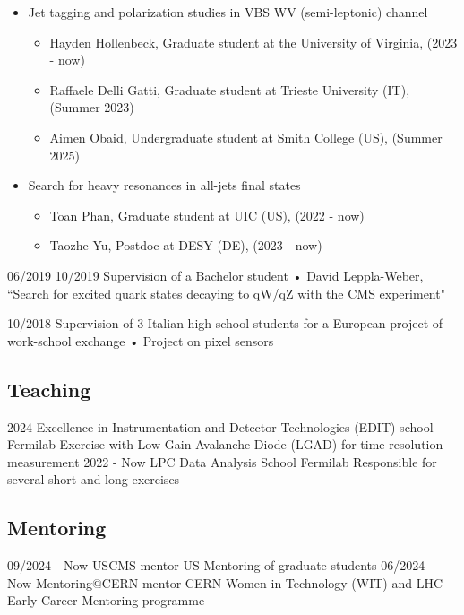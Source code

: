 {\begin{itemize}
\begin{itemize}
    \item Jack Peltier, Undergraduate student at Tennessee University, Knoxville (US),(Summer 2023)  
    \item Nicol\`{o} Salimbeni, Master student at University of Padova (IT), (2023 - now)
    \item Iqra Sohail, Graduate student at National Centre for Physics (PK) and LPC based, (2023 - now)
    \item Colby Thompson, Graduate student at Tennessee University, Knoxville (US),(Summer 2024)
    \item Adam Vendrasco, Graduate student at Tennessee University, Knoxville (US),(2025 - now)
    \end{itemize}
	\item Jet tagging and polarization studies in VBS WV (semi-leptonic) channel
	\begin{itemize}
	\item Hayden Hollenbeck, Graduate student at the University of Virginia, (2023 - now)
	\item Raffaele Delli Gatti, Graduate student at Trieste University (IT), (Summer 2023)
	\item Aimen Obaid, Undergraduate student at Smith College (US), (Summer 2025)
	\end{itemize}
	\item Search for heavy resonances in all-jets final states
	\begin{itemize}
	\item Toan Phan, Graduate student at UIC (US), (2022 - now)
	\item Taozhe Yu, Postdoc at DESY (DE), (2023 - now)
	\end{itemize}

    \end{itemize}
    }

  \teaching
    {06/2019 \textemdash{} 10/2019}
    {Supervision of a Bachelor student • }{David Leppla-Weber, ``Search for excited quark states decaying to qW/qZ with the CMS experiment"}
      
  \teaching
    {10/2018}
    {Supervision of 3 Italian high school students for a European project of work-school exchange • }
    {Project on pixel sensors}
\newpage
\subsection{Teaching}
\position
      {2024} 
      {Excellence in Instrumentation and Detector Technologies (EDIT) school}
      {Fermilab}
      {Exercise with Low Gain Avalanche Diode (LGAD) for time resolution measurement}
	\position
      {2022 - Now} 
      {LPC Data Analysis School}
      {Fermilab}
      {Responsible for several short and long exercises}
\subsection{Mentoring}
	\position
      {09/2024 - Now } 
      {USCMS mentor}
      {US}
      {Mentoring of graduate students}
	\position
      {06/2024 - Now } 
      {Mentoring@CERN mentor}
      {CERN}
      {Women in Technology (WIT) and LHC Early Career Mentoring programme}
